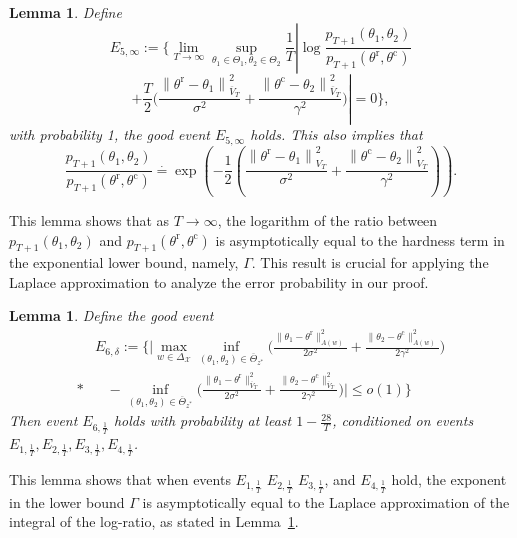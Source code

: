 \documentclass[accepted]{uai2025} %
\theoremstyle{plain}
\newtheorem{lemma}[theorem]{Lemma}
\theoremstyle{definition}
\theoremstyle{remark}
\newcommand{\truethetac}{\theta^{\mathrm{c}}}
\newcommand{\truethetar}{\theta^{\mathrm{r}}}
\begin{document}
\begin{lemma}
\label{lem:GoodEvent_5}
Define
\[
E_{5,\infty} := \bigg\{\lim_{T \to \infty} \sup_{\theta_1 \in \Theta_1, \theta_2 \in \Theta_2} \frac{1}{T} \left| 
\log \frac{p_{T+1}(\theta_1, \theta_2)}{p_{T+1}(\truethetar, \truethetac)} \right.
\]
\[
\left. + \frac{T}{2} \bigg( \frac{\left\| \truethetar - \theta_1 \right\|^2_{\overline{V}_T}}{\sigma^2} 
+ \frac{\left\| \truethetac - \theta_2 \right\|^2_{\overline{V}_T}}{\gamma^2} \bigg)
\right| = 0\bigg\},
\]
with probability 1, the good event $E_{5,\infty}$ holds. This also implies that
\[
\frac{p_{T+1}(\theta_1, \theta_2)}{p_{T+1}(\truethetar, \truethetac)} \stackrel{\cdot}{=} \exp \left( -\frac{1}{2} \left( 
\frac{\left\| \truethetar\! -\! \theta_1 \right\|^2_{{V}_T}}{\sigma^2} 
\!+ \!\frac{\left\| \truethetac \!-\! \theta_2 \right\|^2_{{V}_T}}{\gamma^2} 
\right) \right).
\]
\end{lemma}
This lemma shows that as $T \to \infty$, the logarithm of the ratio between $p_{T+1}(\theta_1, \theta_2)$ and $p_{T+1}(\truethetar, \truethetac)$ is  asymptotically equal to the hardness term in the exponential lower bound, namely,  $\Gamma$. This result is crucial for applying the Laplace approximation to analyze the error probability in our proof.

\begin{lemma}
\label{lem:GoodEvent_6}
Define the good event 
\begin{align*}
&\! E_{6,\delta}\!:=\!\bigg\{
    \bigg| \max_{w \in \Delta_{\mathcal{X}}} \!\inf_{(\theta_1, \theta_2) \in \overline{\Theta}_{z^*}}\!\bigg(\!\frac{\lVert \theta_1 \!-\! \truethetar \rVert^2_{A(w)}}{2\sigma^2}\! +\! \frac{\lVert \theta_2\! -\! \truethetac \rVert^2_{A(w)}}{2\gamma^2}\!\bigg)
      \\*
&\;\;\; -\!\!\inf_{(\theta_1, \theta_2) \in \overline{\Theta}_{z^*}} \bigg(\frac{\lVert \theta_1\! - \!\truethetar \rVert^2_{\overline{V}_T}}{2\sigma^2} \!+ \!\frac{\lVert \theta_2 \!- \!\truethetac \rVert^2_{\overline{V}_T}}{2\gamma^2} \bigg)
    \bigg| \!\le\! o(1)\!
\bigg\}
\end{align*}
Then event \( E_{6,\frac{1}{T}} \) holds with probability at least \( 1 - \frac{28}{T} \), conditioned on events \( E_{1,\frac{1}{T}}, E_{2,\frac{1}{T}}, E_{3,\frac{1}{T}}, E_{4,\frac{1}{T}} \).
\end{lemma}
This lemma shows that when events $  E_{1,\frac{1}{T}}$ $ E_{2,\frac{1}{T}}$ $ E_{3,\frac{1}{T}}$, and $ E_{4,\frac{1}{T}} $ hold, the exponent in the lower bound $\Gamma$ is asymptotically equal to the Laplace approximation of the integral of the log-ratio, as stated in Lemma~\ref{lem:GoodEvent_5}.
\end{document}
